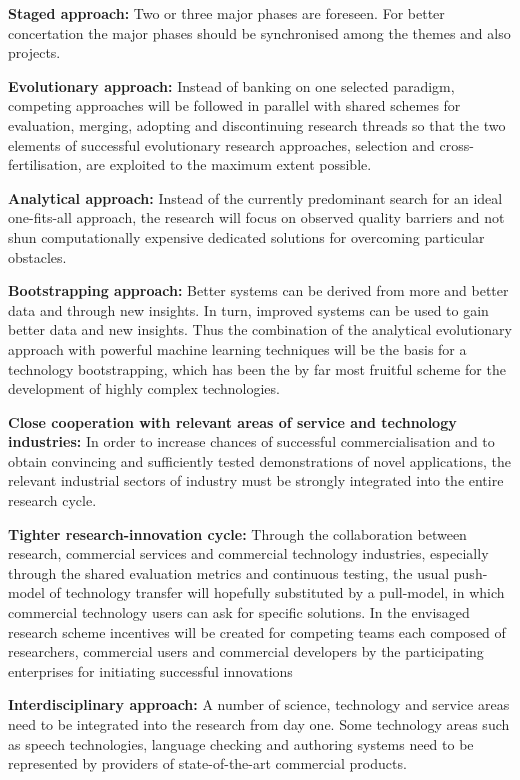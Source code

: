 \documentclass[10pt, plain]{../../metanetpaper}
\begin{document}
\begin{multicols}{2}
\textbf{Staged approach:} Two or three major phases are foreseen. For better concertation the major phases should be synchronised among the themes and also projects.   

\textbf{Evolutionary approach:} Instead of banking on one selected paradigm, competing approaches will be followed in parallel with shared schemes for evaluation, merging, adopting and discontinuing research threads so that the two elements of successful evolutionary research approaches, selection and cross-fertilisation, are exploited to the maximum extent possible.

\textbf{Analytical approach:} Instead of the currently predominant search for an ideal one-fits-all approach, the research will focus on observed quality barriers and not shun computationally expensive dedicated solutions for overcoming particular obstacles.

\textbf{Bootstrapping approach:} Better systems can be derived from more and better data and through new insights. In turn, improved systems can be used to gain better data and new insights. Thus the combination of the analytical evolutionary approach with powerful machine learning techniques will be the basis for a technology bootstrapping, which has been the by far most fruitful scheme for the development of highly complex technologies.

\textbf{Close cooperation with relevant areas of service and technology industries:} In order to increase chances of successful commercialisation and to obtain convincing and sufficiently tested demonstrations of novel applications, the relevant industrial sectors of industry must be strongly integrated into the entire research cycle.

\textbf{Tighter research-innovation cycle:} Through the collaboration between research, commercial services and commercial technology industries, especially through the shared evaluation metrics and continuous testing, the usual push-model of technology transfer will hopefully substituted by a pull-model, in which commercial technology users can ask for specific solutions. In the envisaged research scheme incentives will be created for competing teams each composed of researchers, commercial users and commercial developers by the participating enterprises for initiating successful innovations

\textbf{Interdisciplinary approach:} A number of science, technology and service areas need to be integrated into the research from day one. Some technology areas such as speech technologies, language checking and authoring systems need to be represented by providers of state-of-the-art commercial products.


\end{multicols}
\end{document}
